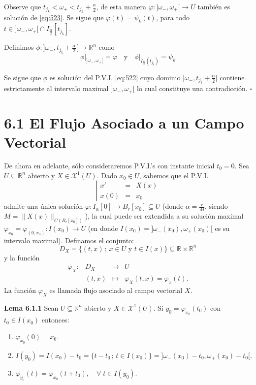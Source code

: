 \documentclass[11pt,a4paper]{article}
\theoremstyle{definition}
\theoremstyle{plain}
\theoremstyle{remark}
\begin{document}
	Observe que $t_{j_k} < \omega_+ < t_{j_k} + \frac{\alpha}{2}$, de esta manera $\varphi : {]\omega_-, \omega_+[} \to U$
	también es solución de \eqref{eq:523}. Se sigue que $\varphi(t) = \psi_k(t)$, para todo $t \in {]\omega_-, \omega_+[} \cap I_{\frac{\alpha}{2}}[t_{j_k}]$.
	
	Definimos $\phi : {]\omega_-, t_{j_k} + \frac{\alpha}{2}[} \to \mathbb{R}^n$ como
	\[
	\left.\phi\right|_{]\omega_-, \omega_+[} = \varphi \quad \text{y} \quad \left.\phi\right|_{I_{\frac{\alpha}{2}}(t_{j_k})} = \psi_k
	\]
	
	Se sigue que $\phi$ es solución del P.V.I. \eqref{eq:522} cuyo dominio ${]\omega_-, t_{j_k} + \frac{\alpha}{2}[}$ contiene estrictamente al intervalo maximal ${]\omega_-, \omega_+[}$ lo cual constituye una contradicción. \hfill $\square$
	\section*{6.1 El Flujo Asociado a un Campo Vectorial}
	
	De ahora en adelante, sólo consideraremos P.V.I.'s con instante inicial $t_0 = 0$. Sea $U \subseteq \mathbb{R}^n$ abierto y $X \in \mathcal{X}^1(U)$. Dado $x_0 \in U$, sabemos que el P.V.I.
	\begin{equation}\label{eq:61}
		\left| 
		\begin{array}{lcl}
			x' &=& X(x) \\
			x(0) &=& x_0
		\end{array}
		\right.
	\end{equation}
	admite una única solución $\varphi : I_\alpha[0] \to B_r[x_0] \subseteq U$ (donde $\alpha = \frac{r}{M}$, siendo $M = \|X(x)\|_{C(B_r[x_0])}$), la cual puede ser extendida a su solución maximal $\varphi_{x_0} = \varphi_{(0,x_0)} : I(x_0) \to U$ (en donde $I(x_0) = {]\omega_-(x_0), \omega_+(x_0)[}$ es su intervalo maximal). Definamos el conjunto:
	\[
	D_X = \{(t,x) \,;\, x \in U \text{ y } t \in I(x)\} \subseteq \mathbb{R} \times \mathbb{R}^n
	\]
	y la función
	\[
	\begin{array}{rccc}
		\varphi_X : & D_X & \to & U \\
		& (t, x) & \mapsto & \varphi_X(t, x) = \varphi_x(t).
	\end{array}
	\]
	La función $\varphi_X$ es llamada flujo asociado al campo vectorial $X$.
	
	\noindent \textbf{Lema 6.1.1} Sean $U \subseteq \mathbb{R}^n$ abierto y $X \in \mathcal{X}^1(U)$. Si $y_0 = \varphi_{x_0}(t_0)$ con $t_0 \in I(x_0)$ entonces:
	\begin{enumerate}
		\item[\textnormal{i)}] $\varphi_{x_0}(0) = x_0$.
		\item[\textnormal{ii)}] $I(y_0) = I(x_0) - t_0 = \{t - t_0 \,;\, t \in I(x_0)\} = {]\omega_-(x_0) - t_0, \omega_+(x_0) - t_0[}$.
		\item[\textnormal{iii)}] $\varphi_{y_0}(t) = \varphi_{x_0}(t + t_0), \quad \forall \; t \in I(y_0)$.
	\end{enumerate}
	
\end{document}
